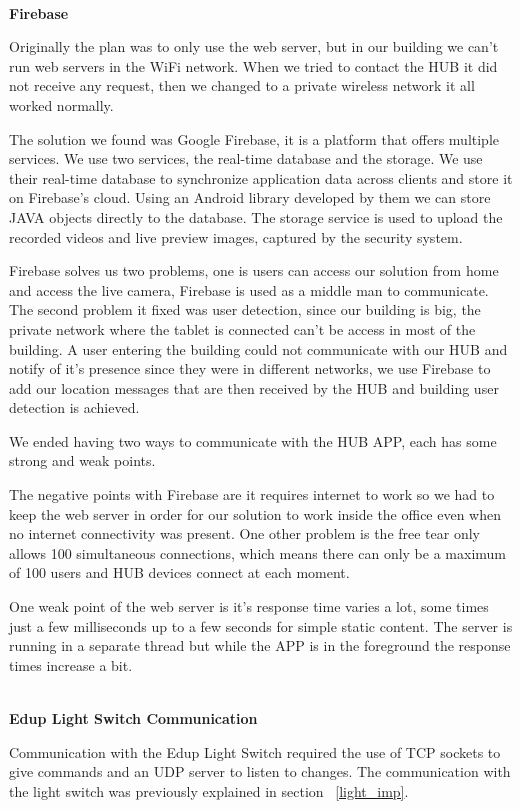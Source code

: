 \mbox{}\\
\textbf{Firebase}

Originally the plan was to only use the web server, but in our building we can't run web servers in the WiFi network. When we tried to contact the HUB it did not receive any request, then we changed to a private wireless network it all worked normally.

The solution we found was Google Firebase, it is a platform that offers multiple services. We use two services, the real-time database and the storage.
We use their real-time database to synchronize application data across clients and store it on Firebase's cloud. Using an Android library developed by them we can store JAVA objects directly to the database. The storage service is used to upload the recorded videos and live preview images, captured by the security system.

Firebase solves us two problems, one is users can access our solution from home and access the live camera, Firebase is used as a middle man to communicate. The second problem it fixed was user detection, since our building is big, the private network where the tablet is connected can't be access in most of the building. A user entering the building could not communicate with our HUB and notify of it's presence since they were in different networks, we use Firebase to add our location messages that are then received by the HUB and building user detection is achieved.

We ended having two ways to communicate with the HUB APP, each has some strong and weak points. 

The negative points with Firebase are it requires internet to work so we had to keep the web server in order for our solution to work inside the office even when no internet connectivity was present. One other problem is the free tear only allows 100 simultaneous connections, which means there can only be a maximum of 100 users and HUB devices connect at each moment.

One weak point of the web server is it's response time varies a lot, some times just a few milliseconds up to a few seconds for simple static content. The server is running in a separate thread but while the APP is in the foreground the response times increase a bit.



\mbox{}\\
\textbf{Edup Light Switch Communication}

Communication with the Edup Light Switch required the use of TCP sockets to give commands and an UDP server to listen to changes. The communication with the light switch was previously explained in section ~\ref{light_imp}.



